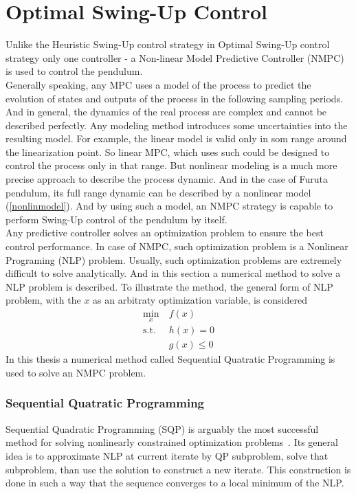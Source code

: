 \section{Optimal Swing-Up Control}\label{nmpcsection}
Unlike the Heuristic Swing-Up control strategy in Optimal Swing-Up control strategy only one controller - a Non-linear Model Predictive Controller (NMPC) is used to control the pendulum.\\

Generally speaking, any MPC uses a model of the process to predict the evolution of states and outputs of the process in the following sampling periods. And in general, the dynamics of the real process are complex and cannot be described perfectly. Any modeling method introduces some uncertainties into the resulting model. For example, the linear model is valid only in som range around the linearization point. So linear MPC, which uses such could be designed to control the process only in that range. But nonlinear modeling is a much more precise approach to describe the process dynamic. And in the case of Furuta pendulum, its full range dynamic can be described by a nonlinear model (\ref{nonlinmodel}). And by using such a model, an NMPC strategy is capable to perform Swing-Up control of the pendulum by itself.\\
Any predictive controller solves an optimization problem to ensure the best control performance. In case of NMPC, such optimization problem is a Nonlinear Programing (NLP) problem. Usually, such optimization problems are extremely difficult to solve analytically. And in this section a numerical method to solve a NLP problem is described. To illustrate the method, the general form of NLP problem, with the $x$ as an arbitraty optimization variable, is considered
\begin{subequations}\label{nlpgeneral}
	\begin{align}
	\min_{x}\  &f(x)\\
	\text{s.t.}\  &h(x) = 0\\
		 &g(x)\leq 0
	\end{align}
\end{subequations}
In this thesis a numerical method called Sequential Quatratic Programming is used to solve an NMPC problem. 
\subsubsection{Sequential Quatratic Programming}\label{SQP:theory}
Sequential Quadratic Programming (SQP) is arguably the most successful method for solving nonlinearly constrained optimization problems~\cite{SQP:Theory}. Its general idea is to approximate NLP at current iterate by QP subproblem, solve that subproblem, than use the solution to construct a new iterate. This construction is done in such a way that the sequence converges to a local minimum of the NLP.

